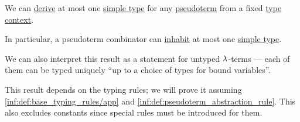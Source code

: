 \begin{proposition}\label{thm:pseudoterm_uniqueness}
  We can \hyperref[def:simple_type_derivability]{derive} at most one \hyperref[def:simple_type]{simple type} for any \hyperref[def:pseudoterm]{pseudoterm} from a fixed \hyperref[def:type_context]{type context}.
\end{proposition}
\begin{comments}
  \item In particular, a pseudoterm combinator can \hyperref[def:type_habitation]{inhabit} at most one \hyperref[def:simple_type]{simple type}.

  \item We can also interpret this result as a statement for untyped \( \mathrm{\lambda} \)-terms --- each of them can be typed uniquely \enquote{up to a choice of types for bound variables}.

  \item This result depends on the typing rules; we will prove it assuming \ref{inf:def:base_typing_rules/app} and \ref{inf:def:pseudoterm_abstraction_rule}. This also excludes constants since special rules must be introduced for them.
\end{comments}
